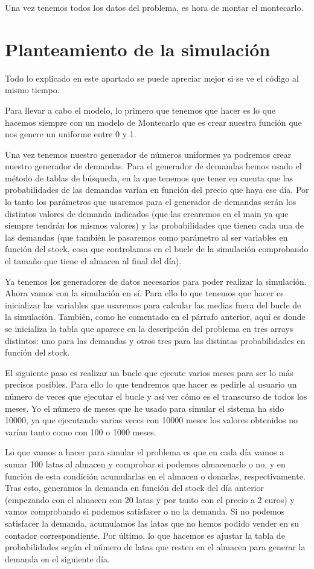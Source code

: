 \documentclass[11pt,a4paper]{report}
\begin{document}
Una vez tenemos todos los datos del problema, es hora de montar el montecarlo.

\section{Planteamiento de la simulación}

Todo lo explicado en este apartado se puede apreciar mejor si se ve el código al mismo tiempo.

Para llevar a cabo el modelo, lo primero que tenemos que hacer es lo que hacemos siempre con un modelo de Montecarlo que es crear nuestra función que nos genere un uniforme entre 0 y 1. 

Una vez tenemos nuestro generador de números uniformes ya podremos crear nuestro generador de demandas. Para el generador de demandas hemos usado el método de tablas de búsqueda, en la que tenemos que tener en cuenta que las probabilidades de las demandas varían en función del precio que haya ese día. Por lo tanto los parámetros que usaremos para el generador de demandas serán los distintos valores de demanda indicados (que las crearemos en el main ya que siempre tendrán los mismos valores) y las probabilidades que tienen cada una de las demandas (que también le pasaremos como parámetro al ser variables en función del stock, cosa que controlamos en el bucle de la simulación comprobando el tamaño que tiene el almacen al final del día).

Ya tenemos los generadores de datos necesarios para poder realizar la simulación. Ahora vamos con la simulación en sí. Para ello lo que tenemos que hacer es inicializar las variables que usaremos para calcular las medias fuera del bucle de la simulación. También, como he comentado en el párrafo anterior, aquí es donde se inicializa la tabla que aparece en la descripción del problema en tres arrays distintos: uno para las demandas y otros tres para las distintas probabilidades en función del stock.

El siguiente paso es realizar un bucle que ejecute varios meses para ser lo más precisos posibles. Para ello lo que tendremos que hacer es pedirle al usuario un número de veces que ejecutar el bucle y así ver cómo es el transcurso de todos los meses. Yo el número de meses que he usado para simular el sistema ha sido 10000, ya que ejecutando varias veces con 10000 meses los valores obtenidos no varían tanto como con 100 o 1000 meses.

Lo que vamos a hacer para simular el problema es que en cada día vamos a sumar 100 latas al almacen y comprobar si podemos almacenarlo o no, y en función de esta condición acumularlas en el almacen o donarlas, respectivamente. Tras esto, generamos la demanda en función del stock del día anterior (empezando con el almacen con 20 latas y por tanto con el precio a 2 euros) y vamos comprobando si podemos satisfacer o no la demanda. Si no podemos satisfacer la demanda, acumulamos las latas que no hemos podido vender en su contador correspondiente. Por último, lo que hacemos es ajustar la tabla de probabilidades según el número de latas que resten en el almacen para generar la demanda en el siguiente día.
\end{document}
